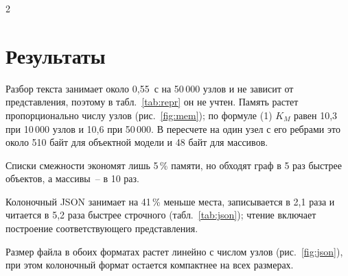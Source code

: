 \documentclass[a4paper,10pt,twoside]{article}
\begin{document}
\begin{multicols}{2}
\section{Результаты}
Разбор текста занимает около 0,55~с на 50\,000 узлов и не зависит от представления, поэтому в табл.~\ref{tab:repr} он не учтен. Память растет пропорционально числу узлов (рис.~\ref{fig:mem}); по формуле (1) $K_M$ равен 10,3 при 10\,000 узлов и 10,6 при 50\,000. В пересчете на один узел с его ребрами это около 510 байт для объектной модели и 48 байт для массивов.


Списки смежности экономят лишь 5\,\% памяти, но обходят граф в 5 раз быстрее объектов, а массивы~-- в 10 раз.


Колоночный JSON занимает на 41\,\% меньше места, записывается в 2,1 раза и читается в 5,2 раза быстрее строчного (табл.~\ref{tab:json}); чтение включает построение соответствующего представления.


Размер файла в обоих форматах растет линейно с числом узлов (рис.~\ref{fig:json}), при этом колоночный формат остается компактнее на всех размерах.



\end{multicols}
\end{document}
